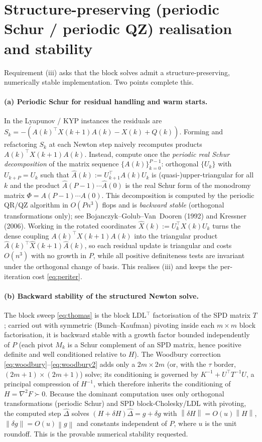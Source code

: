 \documentclass{amsart}
\newcommand{\norm}[1]{\left\lVert#1\right\rVert}
\begin{document}
\section{Structure-preserving (periodic Schur / periodic QZ) realisation and stability}
\label{sec:schur}

Requirement (iii) asks that the block solves admit a structure-preserving,
numerically stable implementation. Two points complete this.

\paragraph{(a) Periodic Schur for residual handling and warm starts.}
In the Lyapunov / KYP instances the residuals are
$S_k=-(A(k)^{\!\top}X(k+1)A(k)-X(k)+Q(k))$. Forming and refactoring $S_k$ at each
Newton step naively recomputes products $A(k)^{\!\top}X(k+1)A(k)$. Instead, compute
once the \emph{periodic real Schur decomposition} of the matrix sequence
$\{A(k)\}_{k=0}^{P-1}$: orthogonal $\{U_k\}$ with $U_{k+P}=U_k$ such that
$\widehat A(k):=U_{k+1}^{\!\top}A(k)U_k$ is (quasi-)upper-triangular for all $k$ and
the product $\widehat A(P-1)\cdots\widehat A(0)$ is the real Schur form of the
monodromy matrix $\Phi=A(P-1)\cdots A(0)$. This decomposition is computed by the
periodic QR/QZ algorithm in $O(Pn^3)$ flops and is \emph{backward stable}
(orthogonal transformations only); see Bojanczyk--Golub--Van~Dooren (1992) and
Kressner (2006). Working in the rotated coordinates $\widehat X(k):=U_k^{\!\top}
X(k)U_k$ turns the dense coupling $A(k)^{\!\top}X(k+1)A(k)$ into the triangular
product $\widehat A(k)^{\!\top}\widehat X(k+1)\widehat A(k)$, so each residual update
is triangular and costs $O(n^3)$ with no growth in $P$, while all positive
definiteness tests are invariant under the orthogonal change of basis. This realises
(iii) and keeps the per-iteration cost \eqref{eq:periter}.

\paragraph{(b) Backward stability of the structured Newton solve.}
The block sweep \eqref{eq:thomas} is the block LDL$^{\!\top}$ factorisation of the SPD
matrix $T$; carried out with symmetric (Bunch--Kaufman) pivoting inside each
$m\times m$ block factorisation, it is backward stable with a growth factor bounded
independently of $P$ (each pivot $M_k$ is a Schur complement of an SPD matrix, hence
positive definite and well conditioned relative to $H$). The Woodbury correction
\eqref{eq:woodbury}--\eqref{eq:woodbury2} adds only a $2m\times2m$ (or, with the
$\tau$ border, $(2m{+}1)\times(2m{+}1)$) solve; its conditioning is governed by
$K^{-1}+U^{\!\top}T^{-1}U$, a principal compression of $H^{-1}$, which therefore
inherits the conditioning of $H=\nabla^2F\succ0$. Because the dominant computation
uses only orthogonal transformations (periodic Schur) and SPD block-Cholesky/LDL
with pivoting, the computed step $\widehat\Delta$ solves
$(H+\delta H)\widehat\Delta=g+\delta g$ with $\norm{\delta H}=O(u)\norm H$,
$\norm{\delta g}=O(u)\norm g$ and constants independent of $P$, where $u$ is the unit
roundoff. This is the provable numerical stability requested.
\end{document}
